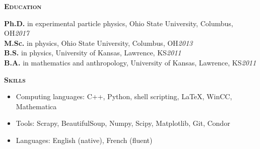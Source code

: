 \documentclass[line]{letter}
\begin{document}
{\vspace{3pt}\Large \textsc{\textbf{Education}}}%
\begin{addmargin}[1em]{1em}
{\bf \large Ph.D.} in experimental particle physics, Ohio State University, Columbus, OH\hfill {\large \it 2017}\vspace{1mm}\\
{\bf \large M.Sc.} in physics, Ohio State University, Columbus, OH\hfill {\large \it 2013}\vspace{1mm}\\
{\bf \large B.S.} in physics, University of Kansas, Lawrence, KS\hfill {\large \it 2011}\vspace{1mm}\\
{\bf \large B.A.} in mathematics and anthropology,  University of Kansas, Lawrence, KS\hfill {\large \it 2011}
\end{addmargin}

{\vspace{7pt}\Large  \textsc{\textbf{Skills}} }
\vspace{-2mm}
\begin{itemize}[leftmargin=5mm]%

\item Computing languages: C++, Python, shell scripting, \LaTeX, WinCC, Mathematica
\item Tools: Scrapy, BeautifulSoup, Numpy, Scipy, Matplotlib, Git, Condor
\item Languages: English (native), French (fluent)
\end{itemize}

\end{document}

